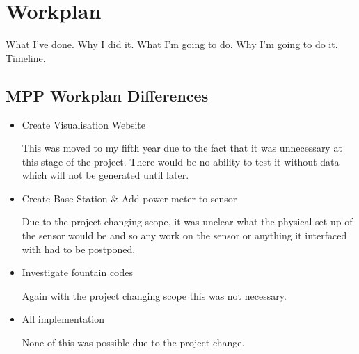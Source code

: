 \section{Workplan}\label{workplan}

What I've done. Why I did it. What I'm going to do. Why I'm going to do it. Timeline.


\subsection{MPP Workplan Differences}

\begin{itemize}

\item Create Visualisation Website

	This was moved to my fifth year due to the fact that it was unnecessary at this stage of the project. There would be no ability to test it without data which will not be generated until later.

\item Create Base Station \& Add power meter to sensor

	Due to the project changing scope, it was unclear what the physical set up of the sensor would be and so any work on the sensor or anything it interfaced with had to be postponed. 

\item Investigate fountain codes
	
	Again with the project changing scope this was not necessary. 

\item All implementation

	None of this was possible due to the project change. 

\end{itemize}






